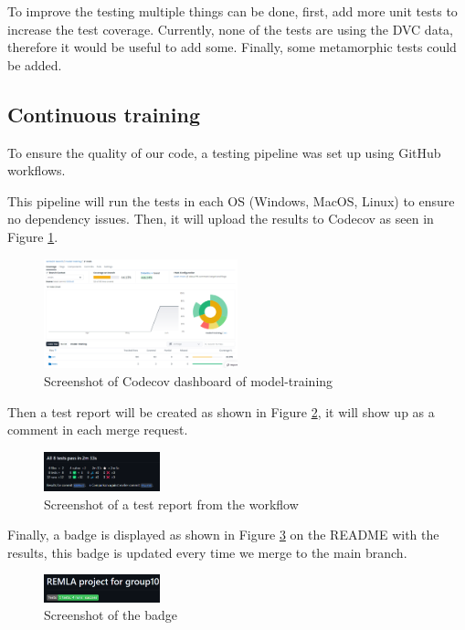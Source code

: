 To improve the testing multiple things can be done, first, add more unit tests to increase the test coverage. Currently, none of the tests are using the DVC data, therefore it would be useful to add some. Finally, some metamorphic tests could be added.
\subsection{Continuous training}

To ensure the quality of our code, a testing pipeline was set up using GitHub workflows.

This pipeline will run the tests in each OS (Windows, MacOS, Linux) to ensure no dependency issues. Then, it will upload the results to Codecov as seen in Figure \ref{fig:codecov}.

\begin{figure}[h!]
    \centering
    \includegraphics[width=0.5\textwidth]{images/codecov.png}
    \caption{Screenshot of Codecov dashboard of model-training}
    \label{fig:codecov}
\end{figure}

Then a test report will be created as shown in Figure \ref{fig:test_results}, it will show up as a comment in each merge request.

\begin{figure}[h!]
    \centering
    \includegraphics[width=0.3\textwidth]{images/test_results.png}
    \caption{Screenshot of a test report from the workflow}
    \label{fig:test_results}
\end{figure}

Finally, a badge is displayed as shown in Figure \ref{fig:badge} on the README with the results, this badge is updated every time we merge to the main branch.



\begin{figure}[h!]
    \centering
    \includegraphics[width=0.3\textwidth]{images/test_badge.png}
    \caption{Screenshot of the badge}
    \label{fig:badge}
\end{figure}